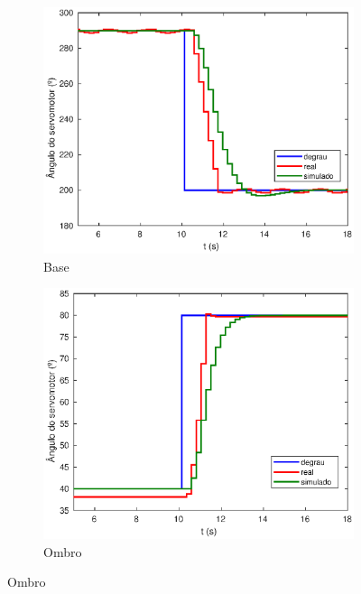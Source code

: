 \begin{figure}[h!]
  
  \centering
  \begin{subfigure}{.5\textwidth}
    \centering
    \includegraphics[width = .9\columnwidth]{Imagens/base_mf_simul}
    \caption{Base}
    \label{fig:base_mf_simul}
  \end{subfigure}%
  \begin{subfigure}{.5\textwidth}
    \centering
    \includegraphics[width = .9\columnwidth]{Imagens/shoulder_mf_simul}
    \caption{Ombro}
    \label{fig:shoulder_mf_simul}
  \end{subfigure}%
  
\end{figure}

